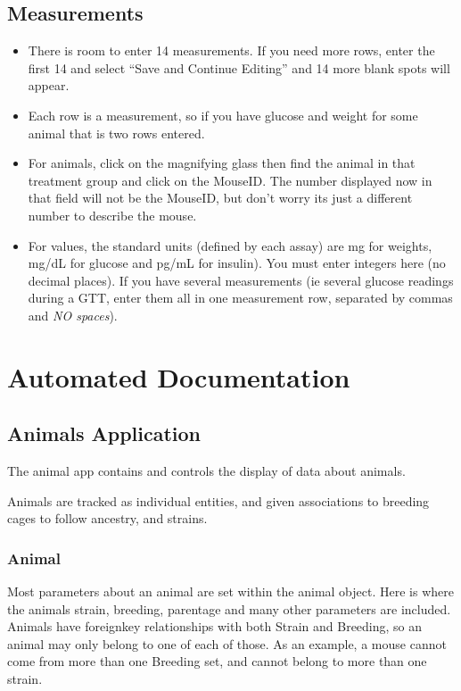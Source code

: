 \documentclass[letterpaper,10pt,english]{sphinxmanual}
\begin{document}
\section{Measurements}
\label{usage:measurements}\begin{itemize}
\item {} 
There is room to enter 14 measurements.  If you need more rows, enter the first 14 and select ``Save and Continue Editing'' and 14 more blank spots will appear.

\item {} 
Each row is a measurement, so if you have glucose and weight for some animal that is two rows entered.

\item {} 
For animals, click on the magnifying glass then find the animal in that treatment group and click on the MouseID. The number displayed now in that field will not be the MouseID, but don't worry its just a different number to describe the mouse.

\item {} 
For values, the standard units (defined by each assay) are mg for weights, mg/dL for glucose and pg/mL for insulin).  You must enter integers here (no decimal places).  If you have several measurements (ie several glucose readings during a GTT, enter them all in one measurement row, separated by commas and \emph{NO spaces}).

\end{itemize}


\chapter{Automated Documentation}
\label{api:automated-documentation}\label{api::doc}

\section{Animals Application}
\label{animals::doc}\label{animals:animals-application}\label{animals:module-mousedb.animal}
The animal app contains and controls the display of data about animals.

Animals are tracked as individual entities, and given associations to breeding cages to follow ancestry, and strains.


\subsection{Animal}
\label{animals:animal}
Most parameters about an animal are set within the animal object.  Here is where the animals strain, breeding, parentage and many other parameters are included.  Animals have foreignkey relationships with both Strain and Breeding, so an animal may only belong to one of each of those.  As an example, a mouse cannot come from more than one Breeding set, and cannot belong to more than one strain.
\end{document}

